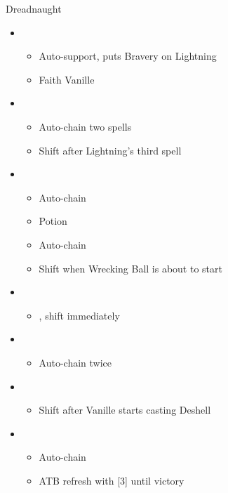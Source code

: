 \documentclass{report}
\begin{document}
\begin{battle}{Dreadnaught}
\begin{multicols}{2}
\begin{itemize}
    \item \second
    \begin{itemize}
        \item Auto-support, puts Bravery on Lightning
        \item Faith Vanille
    \end{itemize}
    \item \fourth
    \begin{itemize}
        \item Auto-chain two spells
        \item Shift after Lightning's third spell
    \end{itemize}
    \item \fifth
    \begin{itemize}
        \item Auto-chain
        \item Potion
        \item Auto-chain
        \item Shift when Wrecking Ball is about to start
    \end{itemize}
    \item \sixth
    \begin{itemize}
        \item \stagger, shift immediately
    \end{itemize}
    \item \first
    \begin{itemize}
        \item Auto-chain twice
    \end{itemize}
    \item \second
    \begin{itemize}
        \item Shift after Vanille starts casting Deshell
    \end{itemize}
    \item \first
    \begin{itemize}
        \item Auto-chain
        \item ATB refresh with [3] until victory
    \end{itemize}
\end{itemize}
\end{multicols}
\end{battle}
\end{document}
